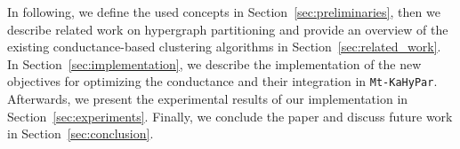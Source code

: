 \documentclass[acmsmall,nonacm,screen,review]{acmart}
\begin{document}
\noindent In following, we define the used concepts in Section~\ref{sec:preliminaries}, 
then we describe related work on hypergraph partitioning and provide an overview
of the existing conductance-based clustering algorithms in Section~\ref{sec:related_work}. In 
Section~\ref{sec:implementation}, we describe the implementation of the new 
objectives for optimizing the conductance and their integration in \texttt{Mt-KaHyPar}. 
Afterwards, we present the experimental results of our implementation in Section~\ref{sec:experiments}. 
Finally, we conclude the paper and discuss future work in Section~\ref{sec:conclusion}.





\end{document}
